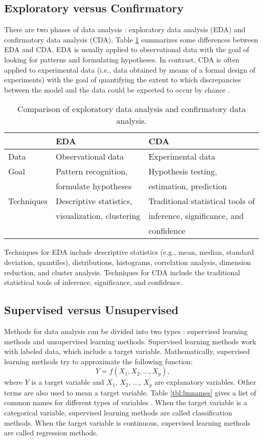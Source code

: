 \documentclass[12pt]{article}
\begin{document}
\subsection{Exploratory versus Confirmatory}
There are two phases of data analysis \citep{good1983data}: exploratory data analysis (EDA) and confirmatory data analysis (CDA). Table \ref{tbl:edacda} summarizes some differences between EDA and CDA. EDA is usually applied to observational data with the goal of looking for patterns and formulating hypotheses. In contrast, CDA 
is often applied to experimental data (i.e., data obtained by means of a formal design of experiments) with the goal of quantifying the extent to which discrepancies between the model and the data could be expected to occur by chance \citep{gelman2004eda}. 

\begin{table}[htbp]
\centering
\caption{Comparison of exploratory data analysis and confirmatory data analysis.}\label{tbl:edacda}
\begin{tabular}{lll}
\toprule
 & \textbf{EDA} & \textbf{CDA} \\
\midrule
Data & Observational data & Experimental data\\[3mm]
Goal & Pattern recognition,  & Hypothesis testing,  \\
& formulate hypotheses & estimation, prediction \\[3mm]
Techniques & Descriptive statistics, & Traditional statistical tools of \\
& visualization, clustering & inference, significance, and\\
& & confidence \\
\bottomrule
\end{tabular}
\end{table}

Techniques for EDA include descriptive statistics (e.g., mean, median, standard deviation, quantiles), distributions, histograms, correlation analysis, dimension reduction, and cluster analysis. Techniques for CDA include the traditional statistical tools of inference, significance, and confidence.

\subsection{Supervised versus Unsupervised}

Methods for data analysis can be divided into two types \citep{abbott2014,igual2017}: supervised learning methods and unsupervised learning methods. Supervised learning methods work with labeled data, which include a target variable. Mathematically, supervised learning methods try to approximate the following function:
\[
Y = f(X_1, X_2, \ldots, X_p),
\]
where $Y$ is a target variable and $X_1$, $X_2$, $\ldots$, $X_p$ are explanatory variables.  Other terms are also used to mean a target variable. Table \ref{tbl:lmnames} gives a list of common names for different types of variables \citep{frees2009}. When the target variable is a categorical variable, supervised learning methods are called classification methods. When the target variable is continuous, supervised learning methods are called regression methods.
\end{document}

